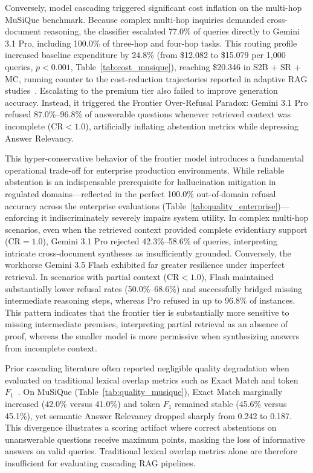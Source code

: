 Conversely, model cascading triggered significant cost inflation on the multi-hop MuSiQue benchmark. Because complex multi-hop inquiries demanded cross-document reasoning, the classifier escalated 77.0\% of queries directly to Gemini 3.1 Pro, including 100.0\% of three-hop and four-hop tasks. This routing profile increased baseline expenditure by 24.8\% (from \$12.082 to \$15.079 per 1,000 queries, $p < 0.001$, Table~\ref{tab:cost_musique}), reaching \$20.346 in S2B + SR + MC, running counter to the cost-reduction trajectories reported in adaptive RAG studies~\citep{jeong2024adaptive, guo2026deepsieve}. Escalating to the premium tier also failed to improve generation accuracy. Instead, it triggered the Frontier Over-Refusal Paradox: Gemini 3.1 Pro refused 87.0\%--96.8\% of answerable questions whenever retrieved context was incomplete ($\text{CR} < 1.0$), artificially inflating abstention metrics while depressing Answer Relevancy.

This hyper-conservative behavior of the frontier model introduces a fundamental operational trade-off for enterprise production environments. While reliable abstention is an indispensable prerequisite for hallucination mitigation in regulated domains---reflected in the perfect 100.0\% out-of-domain refusal accuracy across the enterprise evaluations (Table~\ref{tab:quality_enterprise})---enforcing it indiscriminately severely impairs system utility. In complex multi-hop scenarios, even when the retrieved context provided complete evidentiary support ($\text{CR} = 1.0$), Gemini 3.1 Pro rejected 42.3\%--58.6\% of queries, interpreting intricate cross-document syntheses as insufficiently grounded. Conversely, the workhorse Gemini 3.5 Flash exhibited far greater resilience under imperfect retrieval. In scenarios with partial context ($\text{CR} < 1.0$), Flash maintained substantially lower refusal rates (50.0\%--68.6\%) and successfully bridged missing intermediate reasoning steps, whereas Pro refused in up to 96.8\% of instances. This pattern indicates that the frontier tier is substantially more sensitive to missing intermediate premises, interpreting partial retrieval as an absence of proof, whereas the smaller model is more permissive when synthesizing answers from incomplete context.

Prior cascading literature often reported negligible quality degradation when evaluated on traditional lexical overlap metrics such as Exact Match and token $F_1$~\citep{jeong2024adaptive, guo2026deepsieve}. On MuSiQue (Table~\ref{tab:quality_musique}), Exact Match marginally increased (42.0\% versus 41.0\%) and token $F_1$ remained stable (45.6\% versus 45.1\%), yet semantic Answer Relevancy dropped sharply from 0.242 to 0.187. This divergence illustrates a scoring artifact where correct abstentions on unanswerable questions receive maximum points, masking the loss of informative answers on valid queries. Traditional lexical overlap metrics alone are therefore insufficient for evaluating cascading RAG pipelines.

